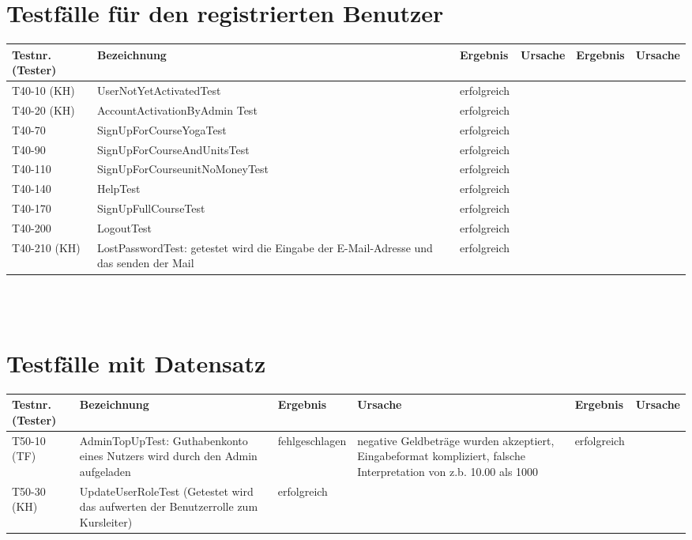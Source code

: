 \begin{landscape}
	\section{Testfälle für den registrierten Benutzer}
		\begin{tabular}{|p{2.0cm} |p{5.0cm}|p{3.0cm}|p{5.0cm}|p{4.0cm}|p{4.0cm}|}
			\hline \textbf{Testnr. (Tester)} & \textbf{Bezeichnung} & \textbf{Ergebnis} & \textbf{Ursache} & \textbf{Ergebnis} & \textbf{Ursache} \\
			\hline T40-10 (KH)  &  UserNotYetActivatedTest        & erfolgreich   &        &         &       \\
			\hline T40-20  (KH) & AccountActivationByAdmin Test  & erfolgreich    &        &         &       \\	
			\hline T40-70   & SignUpForCourseYogaTest & erfolgreich &        &         &       \\	
			\hline T40-90   & SignUpForCourseAndUnitsTest & erfolgreich &        &         &       \\	
			\hline T40-110  & SignUpForCourseunitNoMoneyTest & erfolgreich &        &         &       \\	
			\hline T40-140  & HelpTest & erfolgreich &        &         &       \\	
			\hline T40-170  & SignUpFullCourseTest & erfolgreich &        &         &       \\	
			\hline T40-200  & LogoutTest & erfolgreich &        &         &       \\
			\hline T40-210 (KH) & LostPasswordTest: getestet wird die Eingabe der E-Mail-Adresse und das senden der Mail & erfolgreich &        &         &       \\
			\hline 
		\end{tabular} \ \\
		\ \\
			
	\section{Testfälle mit Datensatz}	
		\begin{tabular}{|p{2.0cm} |p{5.0cm}|p{3.0cm}|p{5.0cm}|p{4.0cm}|p{4.0cm}|}
			\hline \textbf{Testnr. (Tester)} & \textbf{Bezeichnung} & \textbf{Ergebnis} & \textbf{Ursache} & \textbf{Ergebnis} & \textbf{Ursache} \\
			
			\hline  T50-10 (TF) & AdminTopUpTest: Guthabenkonto eines Nutzers wird durch den Admin aufgeladen &     fehlgeschlagen     & negative Geldbeträge wurden akzeptiert,  Eingabeformat kompliziert, falsche Interpretation von z.b. 10.00 als 1000       &    erfolgreich     &       \\	
			\hline  T50-30 (KH)     &  UpdateUserRoleTest (Getestet wird das aufwerten der Benutzerrolle zum Kursleiter)    &    erfolgreich      &        &         &       \\
			

\end{tabular}
\end{landscape}
